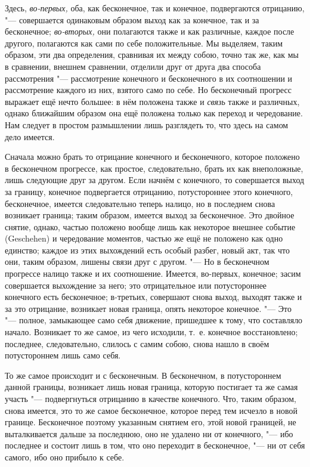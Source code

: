 Здесь, {\em во-первых,} оба, как бесконечное, так и
конечное, подвергаются отрицанию, "--- совершается одинаковым образом выход
как за конечное, так и за бесконечное; {\em во-вторых,}
они полагаются также и как различные, каждое после другого, полагаются как
сами по себе положительные. Мы выделяем, таким образом, эти два
определения, сравнивая их между собою, точно так же, как мы в сравнении,
внешнем сравнении, отделили друг от друга два способа рассмотрения
"--- рассмотрение конечного и бесконечного в их соотношении и рассмотрение
каждого из них, взятого само по себе. Но бесконечный прогресс выражает ещё
нечто большее: в нём положена также и {\em связь} также
и различных, однако ближайшим образом она ещё положена только как переход и
чередование. Нам следует в простом размышлении лишь разглядеть то, что
здесь на самом дело имеется.

Сначала можно брать то отрицание конечного и бесконечного, которое положено
в бесконечном прогрессе, как простое, следовательно, брать их как
внеположные, лишь следующие друг за другом. Если начнём с конечного, то
совершается выход за границу, конечное подвергается отрицанию,
потустороннее этого конечного, бесконечное, имеется следовательно теперь
налицо, но в последнем снова возникает граница; таким образом, имеется
выход за бесконечное. Это двойное снятие, однако, частью положено вообще
лишь как некоторое внешнее событие (Geschehen) и чередование моментов,
частью же ещё не положено как одно единство; каждое из этих выхождений есть
особый разбег, новый акт, так что они, таким образом, лишены связи друг с
другом. "--- Но в бесконечном прогрессе налицо также и их соотношение.
Имеется, во-первых, конечное; засим совершается выхождение за него; это
отрицательное или потустороннее конечного есть бесконечное; в-третьих,
совершают снова выход, выходят также и за это отрицание, возникает новая
граница, опять некоторое конечное. "--- Это "--- полное, замыкающее само себя
движение, пришедшее к тому, что составляло начало. Возникает то же самое,
из чего исходили, т.~е. конечное восстановлено; последнее, следовательно,
слилось с самим собою, снова нашло в своём потустороннем лишь само себя.

То же самое происходит и с бесконечным. В бесконечном, в потустороннем
данной границы, возникает лишь новая граница, которую постигает та же самая
участь "--- подвергнуться отрицанию в качестве конечного. Что, таким образом,
снова имеется, это то же самое бесконечное, которое перед тем исчезло в
новой границе. Бесконечное поэтому указанным снятием его, этой новой
границей, не выталкивается дальше за последнюю, оно не удалено ни от
конечного, "--- ибо последнее и состоит лишь в том, что оно переходит в
бесконечное, "--- ни от себя самого, ибо оно прибыло к себе.

